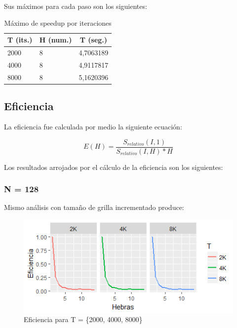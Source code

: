 \documentclass[jou]{apa6}
\begin{document}
Sus máximos para cada paso son los siguientes:

\begin{table}[h]
\centering
\caption{Máximo de speedup por iteraciones}
\label{my-label}
\begin{tabular}{@{}lll@{}}
\toprule
\multicolumn{1}{c}{T (its.)} & \multicolumn{1}{c}{H (num.)} & \multicolumn{1}{c}{T (seg.)} \\ \midrule
2000                         & 8                            & 4,7063189                    \\
4000                         & 8                            & 4,9117817                    \\
8000                         & 8                            & 5,1620396                    \\ \bottomrule
\end{tabular}
\end{table}

\FloatBarrier

\subsection{Eficiencia}
La eficiencia fue calculada por medio la siguiente ecuación:

\[
	E(H) = \frac{S_{relativo}(I, 1)}{S_{relativo}(I, H) * H}
\]

Los resultados arrojados por el cálculo de la eficiencia son los siguientes:

\subsubsection{N = 128}
Mismo análisis con tamaño de grilla incrementado produce:

\begin{figure}[h]
	\includegraphics[width=\columnwidth]{efic-128px.png}
	\caption{Eficiencia para T = \{2000, 4000, 8000\}}
	\label{fig:Figure5}
\end{figure}
\end{document}
